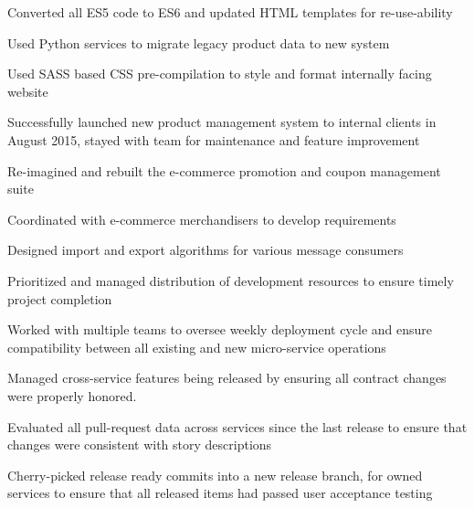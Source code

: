 \documentclass[11pt, a4paper]{awesomecv}
\begin{document}
\begin{cventries}
{\begin{cvitems}
                    \item{Converted all ES5 code to ES6 and updated HTML templates for re-use-ability}
                    \item{Used Python services to migrate legacy product data to new system}
                    \item{Used SASS based CSS pre-compilation to style and format internally facing website}
                    \item{Successfully launched new product management system to internal clients in August 2015, stayed with team for maintenance and feature improvement}
                    \item{Re-imagined and rebuilt the e-commerce promotion and coupon management suite}
                    \item{Coordinated with e-commerce merchandisers to develop requirements}
                    \item{Designed import and export algorithms for various message consumers}
                    \item{Prioritized and managed distribution of development resources to ensure timely project completion}
                    \item{Worked with multiple teams to oversee weekly deployment cycle and ensure compatibility between all existing and new micro-service operations}
                    \item{Managed cross-service features being released by ensuring all contract changes were properly honored.}
                    \item{Evaluated all pull-request data across services since the last release to ensure that changes were consistent with story descriptions}
                    \item{Cherry-picked release ready commits into a new release branch, for owned services to ensure that all released items had passed user acceptance testing}

\end{cvitems}}
\end{cventries}
\end{document}
